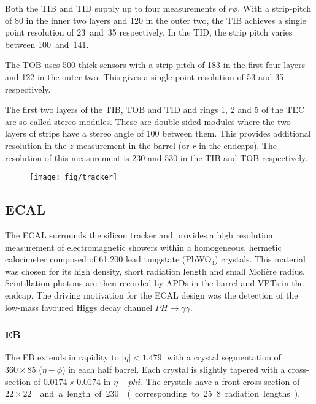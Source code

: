 Both the \ac{TIB} and \ac{TID} supply up to four measurements of $r\phi$. With a
strip-pitch of \unit{80}{\micro\metre} in the inner two layers and
\unit{120}{\micro\metre} in the outer two, the \ac{TIB} achieves a single point
resolution of \unit{23 and 35}{\micro\metre} respectively. In the \ac{TID}, the
strip pitch varies between \unit{100 and 141}{\micro\metre}.

The \ac{TOB} uses \unit{500}{\micro\metre} thick sensors with a strip-pitch of
\unit{183}{\micro\metre} in the first four layers and \unit{122}{\micro\metre} in
the outer two. This gives a single point resolution of \unit{53}{\micro\metre}
and \unit{35}{\micro\metre} respectively.

The first two layers of the \ac{TIB}, \ac{TOB} and \ac{TID} and rings 1, 2 and 5
of the \ac{TEC} are so-called stereo modules. These are double-sided modules
where the two layers of strips have a stereo angle of \unit{100}{\milli\radian}
between them. This provides additional resolution in the $z$ measurement in the
barrel (or $r$ in the endcaps). The resolution of this measurement is
\unit{230}{\micro\metre} and \unit{530}{\micro\metre} in the \ac{TIB} and
\ac{TOB} respectively.

\begin{figure}
\texttt{[image: fig/tracker]}
\end{figure}

\subsection{\acl{ECAL}}
The \ac{ECAL} surrounds the silicon tracker and provides a high resolution
measurement of electromagnetic showers within a homogeneous, hermetic
calorimeter composed of 61,200 lead tungstate (PbWO$_4$) crystals. This material
was chosen for its high density, short radiation length and small Moli\`{e}re
radius. Scintillation photons are then recorded by \ac{APD}s in the barrel and
\ac{VPT}s in the endcap. The driving motivation for the \ac{ECAL} design was the
detection of the low-mass favoured Higgs decay channel
$PH\longrightarrow\gamma\gamma$.

\subsubsection{\acl{EB}}
The \ac{EB} extends in rapidity to $|\eta|<1.479|$ with a crystal
segmentation of $360\times 85$ ($\eta-\phi$) in each half barrel. Each crystal
is slightly tapered with a cross-section of $0.0174\times0.0174$ in
$\eta-phi$. The crystals have a front cross section of \unit{$22\times
  22$}{\milli\metre\squared} and a length of \unit{230}{\milli\metre}
(corresponding to 25.8 radiation lengths).

